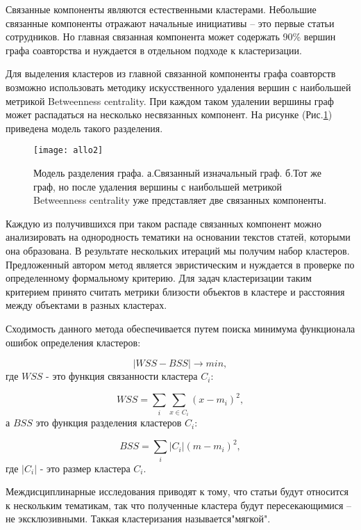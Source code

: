 Связанные компоненты являются естественными кластерами. Небольшие связанные компоненты отражают начальные инициативы – это первые статьи сотрудников. Но главная связанная компонента может содержать 90\% вершин графа соавторства и нуждается в отдельном подходе к кластеризации. 

Для выделения кластеров из главной связанной компоненты графа соавторств возможно использовать методику искусственного удаления вершин с наибольшей метрикой Betweenness centrality. При каждом таком удалении вершины граф может распадаться на несколько несвязанных компонент. На рисунке (Рис.\ref{fig:allo2}) приведена модель такого разделения.

\begin{figure}[H]
  \caption{Модель разделения графа. а.Связанный изначальный граф. б.Тот же граф, но после удаления вершины с наибольшей метрикой Betweenness centrality уже представляет две связанных компоненты.}
  \centering
    \texttt{[image: allo2]}
  \label{fig:allo2}
\end{figure}  

Каждую из получившихся при таком распаде связанных компонент можно анализировать на однородность тематики на основании текстов статей, которыми она образована. В результате нескольких итераций мы получим набор кластеров.
Предложенный автором метод является эвристическим и нуждается в проверке по определенному формальному критерию. Для задач кластеризации таким критерием принято считать метрики близости объектов в кластере и расстояния между объектами в разных кластерах.

Сходимость данного метода обеспечивается путем поиска минимума функционала ошибок определения кластеров:

\begin{equation}
\vert WSS - BSS \vert \rightarrow min , 
\label{eq:allo1}
\end{equation}
где $WSS$ - это функция связанности кластера $C_i$:

\begin{equation}
WSS = \sum_i \sum_{x \in C_i} ( x - m_i)^2 , 
\label{eq:allo2}
\end{equation}
а $BSS$ это функция разделения кластеров $C_i$:

\begin{equation}
BSS = \sum_i \vert C_i \vert ( m - m_i)^2 , 
\label{eq:allo3}
\end{equation}
где $\vert C_i \vert $ - это размер кластера $C_i$.

Междисциплинарные исследования приводят к тому, что статьи будут относится к нескольким тематикам, так что полученные кластера будут пересекающимися – не эксклюзивными. Таккая кластеризания называется"мягкой".

